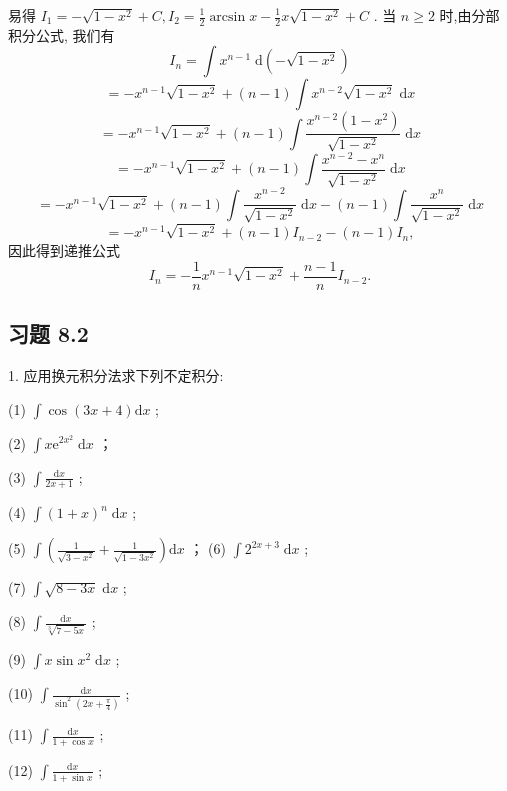 \begin{solution}

\end{solution}
易得 \({I}_{1} =  - \sqrt{1 - {x}^{2}} + C,{I}_{2} = \frac{1}{2}\arcsin x - \frac{1}{2}x\sqrt{1 - {x}^{2}} + C\) . 当 \(n \geq  2\) 时,由分部积分公式, 我们有
\[
{I}_{n} = \int {x}^{n - 1}\mathrm{\;d}\left( {-\sqrt{1 - {x}^{2}}}\right)
\]
\[
=  - {x}^{n - 1}\sqrt{1 - {x}^{2}} + \left( {n - 1}\right) \int {x}^{n - 2}\sqrt{1 - {x}^{2}}\mathrm{\;d}x
\]
\[
=  - {x}^{n - 1}\sqrt{1 - {x}^{2}} + \left( {n - 1}\right) \int \frac{{x}^{n - 2}\left( {1 - {x}^{2}}\right) }{\sqrt{1 - {x}^{2}}}\mathrm{\;d}x
\]
\[
=  - {x}^{n - 1}\sqrt{1 - {x}^{2}} + \left( {n - 1}\right) \int \frac{{x}^{n - 2} - {x}^{n}}{\sqrt{1 - {x}^{2}}}\mathrm{\;d}x
\]
\[
=  - {x}^{n - 1}\sqrt{1 - {x}^{2}} + \left( {n - 1}\right) \int \frac{{x}^{n - 2}}{\sqrt{1 - {x}^{2}}}\mathrm{\;d}x - \left( {n - 1}\right) \int \frac{{x}^{n}}{\sqrt{1 - {x}^{2}}}\mathrm{\;d}x
\]
\[
=  - {x}^{n - 1}\sqrt{1 - {x}^{2}} + \left( {n - 1}\right) {I}_{n - 2} - \left( {n - 1}\right) {I}_{n},
\]
因此得到递推公式
\[
{I}_{n} =  - \frac{1}{n}{x}^{n - 1}\sqrt{1 - {x}^{2}} + \frac{n - 1}{n}{I}_{n - 2}.
\]
\subsection{习题 8.2}

1. 应用换元积分法求下列不定积分:

(1) \(\int \cos \left( {{3x} + 4}\right) \mathrm{d}x\) ;

(2) \(\int x{\mathrm{e}}^{2{x}^{2}}\mathrm{\;d}x\) ；

(3) \(\int \frac{\mathrm{d}x}{{2x} + 1}\) ;

(4) \(\int {\left( 1 + x\right) }^{n}\mathrm{\;d}x\) ;

(5) \(\int \left( {\frac{1}{\sqrt{3 - {x}^{2}}} + \frac{1}{\sqrt{1 - 3{x}^{2}}}}\right) \mathrm{d}x\) ； (6) \(\int {2}^{{2x} + 3}\mathrm{\;d}x\) ;

(7) \(\int \sqrt{8 - {3x}}\mathrm{\;d}x\) ;

(8) \(\int \frac{\mathrm{d}x}{\sqrt[3]{7 - {5x}}}\) ;

(9) \(\int x\sin {x}^{2}\mathrm{\;d}x\) ;

(10) \(\int \frac{\mathrm{d}x}{{\sin }^{2}\left( {{2x} + \frac{\pi }{4}}\right) }\) ;

(11) \(\int \frac{\mathrm{d}x}{1 + \cos x}\) ;

(12) \(\int \frac{\mathrm{d}x}{1 + \sin x}\) ;

